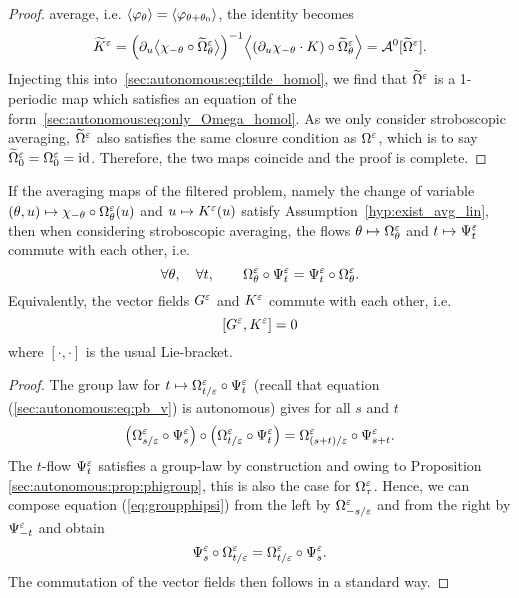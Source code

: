 \begin{proof}
average, i.e. $\langle \varphi_{\theta} \rangle = \langle \varphi_{\theta + \theta_0}
\rangle$, the identity becomes 
\begin{equation*}
  \widetilde{K}^\varepsilon =
  \Big( \partial_u \big \langle \chi_{-\theta} 
    \circ \widetilde\Omega^\varepsilon _\theta \big \rangle \Big) ^{-1}
  \Big \langle (\partial_u \chi_{-\theta} \cdot K) 
    \circ \widetilde\Omega^\varepsilon _\theta \Big \rangle 
  = \mathcal{A}^{0}[\widetilde{\Omega}^\varepsilon] .
\end{equation*}
Injecting this into~\eqref{sec:autonomous:eq:tilde_homol}, we find that
$\widetilde{\Omega}^\varepsilon$ is a 1-periodic map which satisfies an equation
of the form~\eqref{sec:autonomous:eq:only_Omega_homol}. As we only
consider stroboscopic averaging, $\widetilde{\Omega}^\varepsilon$ also satisfies
the same closure condition as $\Omega^\varepsilon$, which is to say
$\widetilde\Omega^\varepsilon _0 = \Omega^\varepsilon _0 = \operatorname{id}$. Therefore, the two maps
coincide and the proof is complete. 

\end{proof}
%
\begin{proposition} \label{sec:autonomous:prop:commut} If the averaging
  maps of the filtered problem, namely the change of variable
  $(\theta,u) \mapsto \chi_{-\theta} \circ \Omega^\varepsilon _\theta(u)$ and
  $u \mapsto K^\varepsilon(u)$ satisfy Assumption~\ref{hyp:exist_avg_lin}, then
  when considering stroboscopic averaging, the flows $\theta \mapsto
  \Omega^\varepsilon_\theta$ and $t \mapsto \Psi^\varepsilon_t$ commute with each
  other, i.e.
  $$
  \forall \theta, \quad \forall t, \qquad \Omega^\varepsilon_\theta \circ \Psi^\varepsilon_{t} = \Psi^\varepsilon_{t} \circ \Omega^\varepsilon_\theta.
  $$
  Equivalently, the vector fields $G^\varepsilon$ and $K^\varepsilon$ commute with each
  other, i.e.
  $$
  [G^\varepsilon,K^\varepsilon]=0
  $$
  where $[\cdot,\cdot]$ is the usual Lie-bracket.
\end{proposition}
\begin{proof}
  The group law for $t \mapsto \Omega^\varepsilon_{t/\varepsilon} \circ \Psi^\varepsilon_{t}$
  (recall that equation (\ref{sec:autonomous:eq:pb_v}) is autonomous) gives for all $s$
  and $t$
  \begin{align} \label{eq:groupphipsi}
    \left(\Omega^\varepsilon_{s/\varepsilon} \circ \Psi^\varepsilon_{s} \right) \circ \left(\Omega^\varepsilon_{t/\varepsilon} \circ \Psi^\varepsilon_{t} \right) = \Omega^\varepsilon_{(s+t)/\varepsilon} \circ \Psi^\varepsilon_{s+t}.
  \end{align}
  The $t$-flow $\Psi^\varepsilon_t$ satisfies a group-law by construction and
  owing to Proposition \ref{sec:autonomous:prop:phigroup}, this is also
  the case for $\Omega^\varepsilon_\tau$. Hence, we can compose equation
  (\ref{eq:groupphipsi}) from the left by $\Omega^\varepsilon_{-s/\varepsilon}$ and from
  the right by $\Psi^\varepsilon_{-t}$ and obtain 
  $$
  \Psi^\varepsilon_{s}  \circ \Omega^\varepsilon_{t/\varepsilon} = \Omega^\varepsilon_{t/\varepsilon} \circ \Psi^\varepsilon_{s}.
  $$
  The commutation of the vector fields then follows in a standard way. 
\end{proof}


